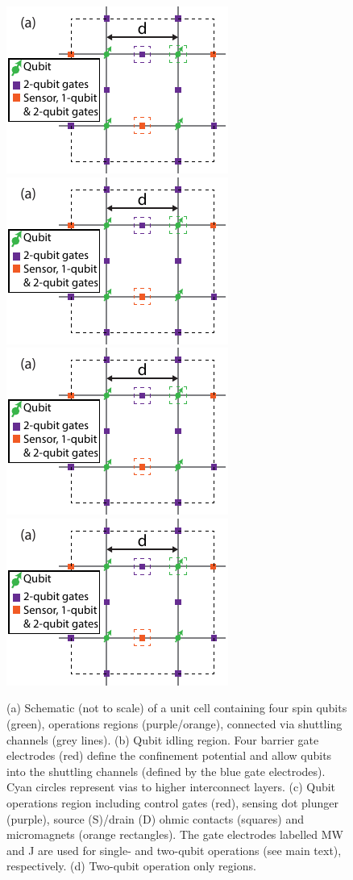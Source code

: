 \documentclass[aps,prl,reprint,superscriptaddress,floatfix]{revtex4-1}
\begin{document}
\begin{figure}[t]
    \centering
    \includegraphics[height=0.225\textwidth,page=1]{Figure_2_unit_cell_schematic.pdf}
    \includegraphics[height=0.225\textwidth,page=2]{Figure_2_unit_cell_schematic.pdf}
    \includegraphics[height=0.225\textwidth,page=3]{Figure_2_unit_cell_schematic.pdf}
    \includegraphics[height=0.225\textwidth,page=4]{Figure_2_unit_cell_schematic.pdf}
    \caption{(a) Schematic (not to scale) of a unit cell containing four spin qubits (green), operations regions (purple/orange), connected via shuttling channels (grey lines). (b) Qubit idling region. Four barrier gate electrodes (red) define the confinement potential and allow qubits into the shuttling channels (defined by the blue gate electrodes). Cyan circles represent vias to higher interconnect layers. (c) Qubit operations region including control gates (red), sensing dot plunger (purple), source (S)/drain (D) ohmic contacts (squares) and micromagnets (orange rectangles). The gate electrodes labelled MW and J are used for single- and two-qubit operations (see main text), respectively. (d) Two-qubit operation only regions.}
    \label{fig:unit_cell_schematics}
\end{figure}
\end{document}
